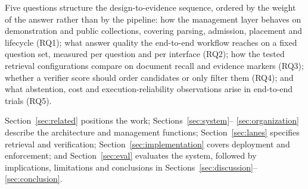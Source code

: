 Five questions structure the design-to-evidence sequence, ordered by the
weight of the answer rather than by the pipeline: how the management layer
behaves on demonstration and public collections, covering parsing, admission, placement and
lifecycle (RQ1); what answer quality the end-to-end workflow reaches on a fixed
question set, measured per question and per interface (RQ2); how the tested
retrieval configurations compare on document recall and evidence markers
(RQ3); whether a verifier score should order candidates or only filter them
(RQ4); and what abstention, cost and execution-reliability observations arise
in end-to-end trials (RQ5).

Section~\ref{sec:related} positions the work; Sections~\ref{sec:system}--
\ref{sec:organization} describe the architecture and management functions;
Section~\ref{sec:lanes} specifies retrieval and verification;
Section~\ref{sec:implementation} covers deployment and enforcement; and
Section~\ref{sec:eval} evaluates the system, followed by implications,
limitations and conclusions in
Sections~\ref{sec:discussion}--\ref{sec:conclusion}.
